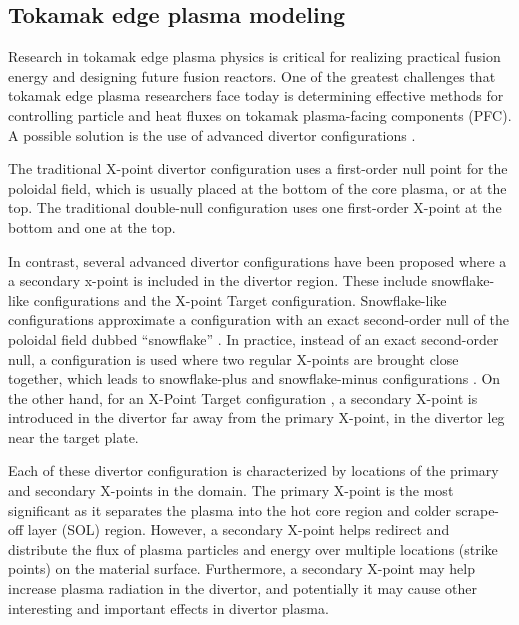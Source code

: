 \subsection{\label{sec:level2}Tokamak edge plasma modeling}
%
Research in tokamak edge plasma physics is critical for realizing
practical fusion energy and designing future fusion reactors. One of
the greatest challenges that tokamak edge plasma researchers face
today is determining effective methods for controlling particle and
heat fluxes on tokamak plasma-facing components (PFC). A possible
solution is the use of advanced divertor configurations
\cite{Kotschenreuther2007}.

The traditional X-point divertor configuration uses a first-order null
point for the poloidal field, which is usually placed at the bottom of
the core plasma, or at the top. The traditional double-null
configuration uses one first-order X-point at the bottom and one at
the top.

In contrast, several advanced divertor configurations have been
proposed where a a secondary x-point is included in the divertor
region. These include snowflake-like configurations and the X-point
Target configuration. Snowflake-like configurations approximate a
configuration with an exact second-order null of the poloidal field
dubbed ``snowflake'' \cite{Ryutov2007}. In practice, instead of an
exact second-order null, a configuration is used where two regular
X-points are brought close together, which leads to snowflake-plus and
snowflake-minus configurations \cite{Ryutov2008}. On the other hand,
for an X-Point Target configuration \cite{LaBombard2015}, a secondary
X-point is introduced in the divertor far away from the primary
X-point, in the divertor leg near the target plate.

Each of these divertor configuration is characterized by locations of
the primary and secondary X-points in the domain. The primary X-point
is the most significant as it separates the plasma into the hot core
region and colder scrape-off layer (SOL) region. However, a secondary
X-point helps redirect and distribute the flux of plasma particles and
energy over multiple locations (strike points) on the material
surface.  Furthermore, a secondary X-point may help increase plasma
radiation in the divertor, and potentially it may cause other
interesting and important effects in divertor plasma.



